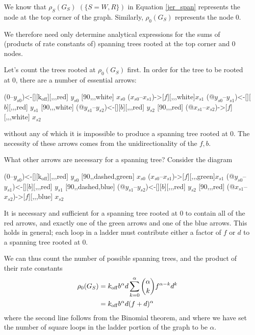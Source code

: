 We know that $\rho_S(G_S)$ $(\{S=W,R\})$ in Equation \ref{jer_span} represents the node at the top corner of the graph.  Similarly, $\rho_0(G_S)$ represents the node 0. 

We therefore need only determine analytical expressions for the sums of (products of rate constants of) spanning trees rooted at the top corner and 0 nodes. 

Let's count the trees rooted at $\rho_0(G_S)$ first.  In order for the tree to be rooted at $0$, there are a number of essential arrows:

\bigskip

\begin{center}
 \arrow(0--$y_{s0}$){<-[][$\mathrm{k_{off}}$]}[,,,red] $y_{s0}$
\arrow{<=>[$u$][$d$]}[90,,,white] 
$x_{s0}$ \arrow($x_{s0}$--$x_{s1}$){->[$f$]}[,,,white]$x_{s1}$
\arrow(@$y_{s0}$--$y_{s1}$){<-[][$b$]}[,,,red] $y_{s1}$ \arrow{<=>[$u$][$d$]}[90,,,white]
\arrow(@$y_{s1}$--$y_{s2}$){<-[][$b$]}[,,,red] $y_{s2}$
\arrow{<-[][$d$]}[90,,,red] 
\arrow(@$x_{s1}$--$x_{s2}$){->[$f$]}[,,,white] $x_{s2}$
\schemestop
\end{center}
without any of which it is impossible to produce a spanning tree rooted at $0.$  The necessity of these arrows comes from the unidirectionality of the $f, b.$

What other arrows are necessary for a spanning tree?  Consider the diagram

\begin{center}
 \arrow(0--$y_{s0}$){<-[][$\mathrm{k_{off}}$]}[,,,red] $y_{s0}$
\arrow{<-[][$d$]}[90,,dashed,green] 
$x_{s0}$ \arrow($x_{s0}$--$x_{s1}$){->[$f$]}[,,,green]$x_{s1}$
\arrow(@$y_{s0}$--$y_{s1}$){<-[][$b$]}[,,,red] $y_{s1}$ \arrow{<-[][$d$]}[90,,dashed,blue]
\arrow(@$y_{s1}$--$y_{s2}$){<-[][$b$]}[,,,red] $y_{s2}$
\arrow{<-[][$d$]}[90,,,red] 
\arrow(@$x_{s1}$--$x_{s2}$){->[$f$]}[,,,blue] $x_{s2}$
\schemestop
\end{center}

It is necessary and sufficient for a spanning tree rooted at $0$ to contain all of the red arrows, and exactly one of the green arrows and one of the blue arrows.  This holds in general; each loop in a ladder must contribute either a factor of $f$ or $d$ to a spanning tree rooted at 0.

We can thus count the number of possible spanning trees, and the product of their rate constants
\[
\begin{aligned}
\rho_0(G_S) &= k_{\rm off}b^\alpha d \sum_{k=0}^\alpha {\alpha\choose k}f^{\alpha-k}d^k\\
&=k_{\rm off}b^\alpha d (f + d)^\alpha
\end{aligned}
\]
where the second line follows from the Binomial theorem, and where we have set the number of square loops in the ladder portion of the graph to be $\alpha.$


